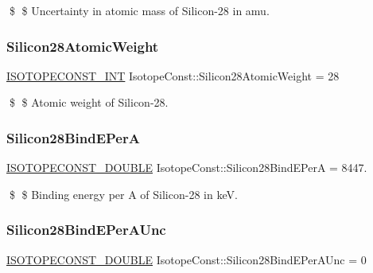\$ \$ Uncertainty in atomic mass of Silicon-\/28 in amu. \mbox{\label{group___isotope_const-_silicon-_si28_gadf3b2a4fefeb59528ae3f1417ba5b983}} 
\subsubsection{\texorpdfstring{Silicon28\+Atomic\+Weight}{Silicon28AtomicWeight}}
{\footnotesize\ttfamily \mbox{\hyperlink{group___isotope_const-_macros_ga5f18360b3e99483a35c32d789e62621c}{I\+S\+O\+T\+O\+P\+E\+C\+O\+N\+S\+T\+\_\+\+I\+NT}} Isotope\+Const\+::\+Silicon28\+Atomic\+Weight = 28}

\$ \$ Atomic weight of Silicon-\/28. \mbox{\label{group___isotope_const-_silicon-_si28_ga5619376315958769956131ab9453b3e9}} 
\subsubsection{\texorpdfstring{Silicon28\+Bind\+E\+PerA}{Silicon28BindEPerA}}
{\footnotesize\ttfamily \mbox{\hyperlink{group___isotope_const-_macros_ga8f45a7272ce02c0b4c65c44636ed719a}{I\+S\+O\+T\+O\+P\+E\+C\+O\+N\+S\+T\+\_\+\+D\+O\+U\+B\+LE}} Isotope\+Const\+::\+Silicon28\+Bind\+E\+PerA = 8447.}

\$ \$ Binding energy per A of Silicon-\/28 in keV. \mbox{\label{group___isotope_const-_silicon-_si28_ga359676171d7da476271d3bd6dc19f89f}} 
\subsubsection{\texorpdfstring{Silicon28\+Bind\+E\+Per\+A\+Unc}{Silicon28BindEPerAUnc}}
{\footnotesize\ttfamily \mbox{\hyperlink{group___isotope_const-_macros_ga8f45a7272ce02c0b4c65c44636ed719a}{I\+S\+O\+T\+O\+P\+E\+C\+O\+N\+S\+T\+\_\+\+D\+O\+U\+B\+LE}} Isotope\+Const\+::\+Silicon28\+Bind\+E\+Per\+A\+Unc = 0}

